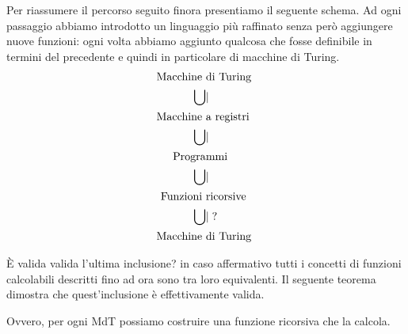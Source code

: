 Per riassumere il percorso seguito finora presentiamo il seguente schema.
Ad ogni passaggio abbiamo introdotto un linguaggio pi\`u
raffinato senza per\`o aggiungere nuove funzioni:
 ogni volta abbiamo aggiunto qualcosa che fosse definibile in
termini del precedente e quindi in particolare di macchine di Turing.
\begin{align*}
{\rm Macchine\ }&{\rm di\ Turing\ }\\
\bigcup &|\\
{\rm Macchine\ }&{\rm a\ registri\ }\\
\bigcup &|\\
{\rm Progra}&{\rm mmi}\\
\bigcup &|\\
{\rm Funzioni\ }&{\rm ricorsive\ }\\
\bigcup &| \; {\rm?}\\
{\rm Macchine\ }&{\rm di\ Turing\ }\\
\end{align*}

È valida valida l'ultima inclusione? in caso affermativo tutti i
concetti di funzioni calcolabili descritti fino ad ora sono tra loro
equivalenti. Il seguente teorema dimostra che quest'inclusione è
effettivamente valida.

\begin{teorema}
Ovvero, per ogni MdT possiamo costruire una funzione ricorsiva che la calcola.
\end{teorema}

